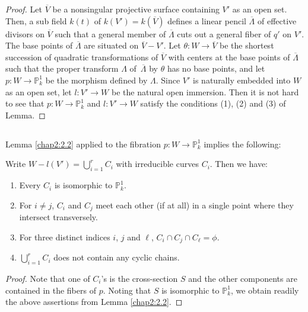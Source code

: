 \begin{proof}
Let $\overline{V}$ be a nonsingular projective surface containing $V'$
as an open set. Then, a sub field $k(t)$ of $k(V')=k(\overline{V})$
defines a linear pencil $\overline{\Lambda}$ of effective divisors on
$\overline{V}$ such that a general member of $\overline{\Lambda}$ cuts
out a general fiber of $q'$ on $V'$. The base points of
$\overline{\Lambda}$ are situated on $\overline{V}-V'$. Let
$\theta:W\to \overline{V}$ be the shortest succession of quadratic
transformations of $\overline{V}$ with centers at the base points of
$\overline{\Lambda}$ such that the proper transform $\Lambda$
of\pageoriginale\ $\overline{\Lambda}$ by $\theta$ has no base points,
and let $p:W\to \mathbb{P}^{1}_{k}$ be the morphism defined by
$\Lambda$. Since $V'$ is naturally embedded into $W$ as an open set,
let $l:V'\to W$ be the natural open immersion. Then it is not hard to
see that $p:W\to\mathbb{P}^{1}_{k}$ and $l:V'\to W$ satisfy the
conditions (1), (2) and (3) of Lemma.
\end{proof}

\subsection{}\label{chap2:5.18}
Lemma \ref{chap2:2.2} applied to the fibration $p:W\to
\mathbb{P}^{1}_{k}$ implies the following:

\begin{lemma*}
  Write $W-l(V')={\displaystyle{\mathop{\bigcup}^{r}_{i=1}}}C_{i}$ with
  irreducible curves $C_{i}$. Then we have:
  \begin{enumerate}
    \renewcommand{\labelenumi}{\rm(\theenumi)}
  \item Every $C_{i}$ is isomorphic to $\mathbb{P}^{1}_{k}$.
    
  \item For $i\neq j$, $C_{i}$ and $C_{j}$ meet each other (if at all)
    in a single point where they intersect transversely.
    
  \item For three distinct indices $i$, $j$ and $\ell$, $C_{i}\cap
    C_{j}\cap C_{\ell}=\phi$.
    
  \item ${\displaystyle{\mathop{\bigcup}^{r}_{i=1}}}C_{i}$ does not
    contain any cyclic chains.
  \end{enumerate}
\end{lemma*}

\begin{proof}
Note that one of $C_{i}$'s is the cross-section $S$ and the other
components are contained in the fibers of $p$. Noting that $S$ is
isomorphic to $\mathbb{P}^{1}_{k}$, we obtain readily the above
assertions from Lemma \ref{chap2:2.2}.
\end{proof}

